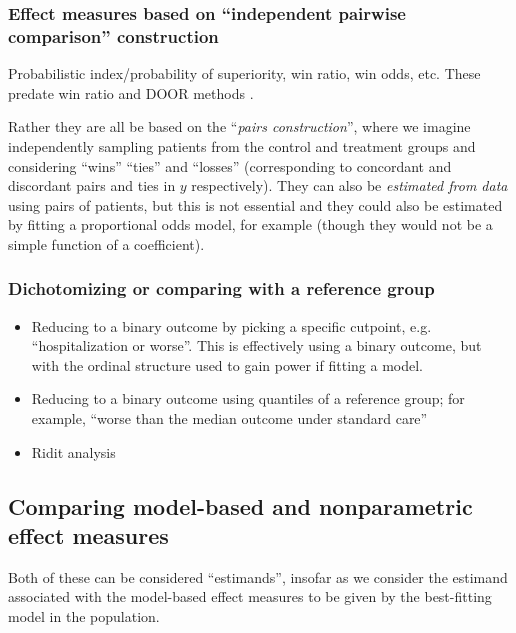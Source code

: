 \documentclass[
  11pt,
  fleqn
]{article}
\begin{document}
\subsubsection{Effect measures based on ``independent pairwise
comparison'' construction}

Probabilistic index/probability of
superiority, win ratio, win odds, etc. These predate win ratio and DOOR methods
\citep[e.g.][p.~14]{agrestiAnalysisOrdinalCategorical2010}.

Rather they are all be based on the ``\emph{pairs construction}'',
where we imagine independently sampling patients from the control and
treatment groups and considering ``wins'' ``ties'' and ``losses''
(corresponding to concordant and discordant pairs and ties in $y$
respectively). They can
also be \emph{estimated from data} using pairs of patients, but this
is not essential and they could also be estimated by fitting a
proportional odds model, for example (though they would not be a
simple function of a coefficient).

\subsubsection{Dichotomizing or comparing with a reference group}

\begin{itemize}
  \item Reducing to a binary outcome by picking a specific cutpoint,
    e.g. ``hospitalization or
    worse''. This is effectively using a binary outcome, but with the
    ordinal structure used to gain power if fitting a model.
  \item Reducing to a binary outcome using quantiles of a reference
    group; for example,
    ``worse than the median outcome under standard care''
  \item Ridit analysis
    \citep{brossHowUseRidit1958,agrestiAnalysisOrdinalCategorical2010,
    smithsonReceiverOperatingCharacteristic2023, jansenRiditAnalysisReview1984}
\end{itemize}

\subsection{Comparing model-based and nonparametric effect measures}

Both of these can be considered ``estimands'', insofar as we consider the
estimand associated with the model-based effect measures to be given by the
best-fitting model in the population.
\end{document}
